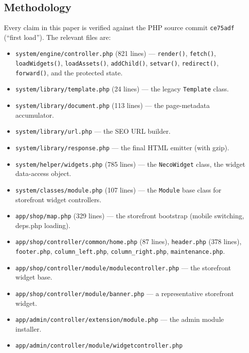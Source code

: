 \documentclass[11pt,a4paper]{article}
\begin{document}
\subsection{Methodology}

Every claim in this paper is verified against the PHP source commit
\texttt{ce75adf} (``first load''). The relevant files are:

\begin{itemize}[leftmargin=1.6em,itemsep=2pt]
  \item \texttt{system/engine/controller.php} (821 lines) ---
        \texttt{render()}, \texttt{fetch()}, \texttt{loadWidgets()},
        \texttt{loadAssets()}, \texttt{addChild()}, \texttt{setvar()},
        \texttt{redirect()}, \texttt{forward()}, and the protected
        state.
  \item \texttt{system/library/template.php} (24 lines) --- the
        legacy \texttt{Template} class.
  \item \texttt{system/library/document.php} (113 lines) --- the
        page-metadata accumulator.
  \item \texttt{system/library/url.php} --- the SEO URL builder.
  \item \texttt{system/library/response.php} --- the final HTML
        emitter (with gzip).
  \item \texttt{system/helper/widgets.php} (785 lines) --- the
        \texttt{NecoWidget} class, the widget data-access object.
  \item \texttt{system/classes/module.php} (107 lines) --- the
        \texttt{Module} base class for storefront widget
        controllers.
  \item \texttt{app/shop/map.php} (329 lines) --- the storefront
        bootstrap (mobile switching, deps.php loading).
  \item \texttt{app/shop/controller/common/home.php} (87 lines),
        \texttt{header.php} (378 lines), \texttt{footer.php},
        \texttt{column\_left.php}, \texttt{column\_right.php},
        \texttt{maintenance.php}.
  \item \texttt{app/shop/controller/module/modulecontroller.php}
        --- the storefront widget base.
  \item \texttt{app/shop/controller/module/banner.php} --- a
        representative storefront widget.
  \item \texttt{app/admin/controller/extension/module.php} ---
        the admin module installer.
  \item \texttt{app/admin/controller/module/widgetcontroller.php}

\end{itemize}
\end{document}

